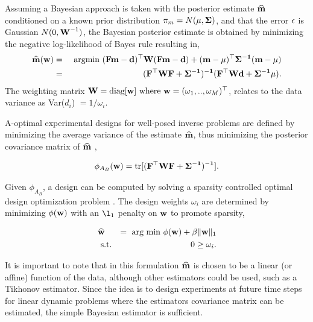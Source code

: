 \documentclass[12pt]{article}
\newcommand {\bfd}   { {\bf d} }
\newcommand {\bfw}   { {\bf w} }
\newcommand {\bfm}   { {\bf m} }
\newcommand {\bfF}  { {\bf F} }
\newcommand{\W}{\text{\bf W}}
\newcommand{\mhat}{\widehat{\bf m}}
\newcommand{\Sig}{\bf \Sigma}
\begin{document}
Assuming a Bayesian approach is taken with the posterior estimate  $\mhat$ conditioned on a known prior distribution $\pi_m = N({\bf \mu},\Sig)$, and that the error ${\bf \epsilon}$ is Gaussian $N(0,\W^{-1})$, the Bayesian posterior estimate is obtained by minimizing the negative log-likelihood of Bayes rule resulting in,
\begin{eqnarray*}
\mhat(\bfw) &=& \text{ argmin } (\bfF \bfm- \bfd)^{\top} \W(\bfF \bfm- \bfd) + (\bfm-{\bf \mu})^{\top}\Sig^{-1}(\bfm-{\bf \mu})\\
 &=& (\bfF^{\top} \W \bfF + \Sig^{-1})^{-1}(\bfF^{\top} \W \bfd + \Sig^{-1}{\bf \mu}).
\end{eqnarray*}     
 The weighting matrix $\W = \text{diag}[\bfw] \text{ where } \bfw = (\omega_1,..,\omega_M)^{\top}$, relates to the data variance as Var($d_{i}$) $=1/\omega_i$. 
 
\bigskip


A-optimal experimental designs for well-posed inverse problems are defined by  minimizing the average variance of the estimate $\mhat$, thus minimizing the posterior covariance matrix of $\mhat$ \cite{Atkinson1992}, 
  
  \begin{equation}
  \label{AB}
  \phi_{A_B}(\bfw) = \text{tr}[(\bfF^{\top} \W \bfF + \Sig^{-1})^{-1}].
  \end{equation}


Given $\phi_{A_B}$, a design can be computed by solving a sparsity controlled optimal design optimization problem \cite{Haber2008}. The design weights $\omega_i$ are determined  by minimizing  $\phi(\bfw)$ with an $\l_1$ penalty on  $\bfw$ to promote sparsity,


\begin{eqnarray}
\label{design}
&\widehat{\bfw}& = \text{ arg min } \phi(\bfw) + \beta\|\bfw\|_1\\
\nonumber
 &\text{ s.t.}& 0 \geq \omega_i.
\end{eqnarray}

It is important to note that in this formulation $\mhat$ is chosen to be a linear (or affine) function of the data, although  other estimators could be used, such as a Tikhonov estimator. Since the idea is to  design experiments at future time steps for linear dynamic problems  where the estimators covariance matrix can be estimated, the simple Bayesian estimator is sufficient.
\end{document}
